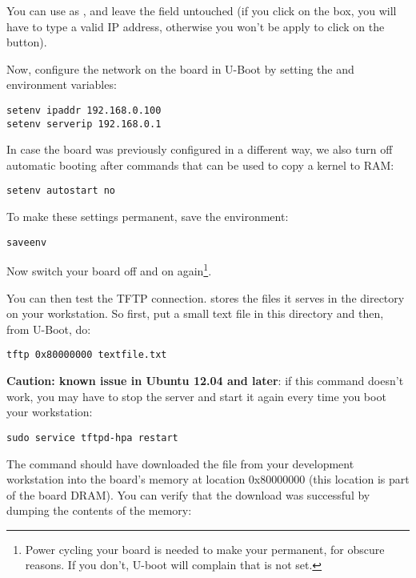 You can use  as , and leave the
 field untouched (if you click on the  box, you
will have to type a valid IP address, otherwise you won't be apply to
click on the  button).

Now, configure the network on the board in U-Boot by setting the 
and  environment variables:

\begin{verbatim}
setenv ipaddr 192.168.0.100
setenv serverip 192.168.0.1
\end{verbatim}

In case the board was previously configured in a different way, we
also turn off automatic booting after commands that can be used to
copy a kernel to RAM:

\begin{verbatim}
setenv autostart no
\end{verbatim}

To make these settings permanent, save the environment:

\begin{verbatim}
saveenv
\end{verbatim}

Now switch your board off and on again\footnote{Power cycling your
  board is needed to make your  permanent, for obscure
  reasons. If you don't, U-boot will complain that  is not
  set.}.

You can then test the TFTP connection.  stores the files
it serves in the  directory on your
workstation. So first, put a small text file in this directory and
then, from U-Boot, do:

\begin{verbatim}
tftp 0x80000000 textfile.txt
\end{verbatim}

{\bf Caution: known issue in Ubuntu 12.04 and later}:
if this command doesn't work, you may have to stop the server
and start it again every time you boot your workstation:

\begin{verbatim}
sudo service tftpd-hpa restart
\end{verbatim}

The  command should have downloaded
the  file from your development
workstation into the board's memory at location 0x80000000 (this
location is part of the board DRAM). You can verify that the download
was successful by dumping the contents of the memory:

